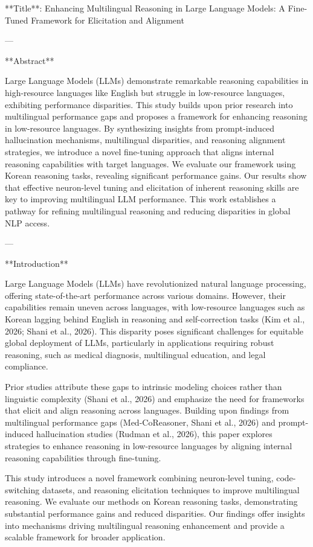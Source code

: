 **Title**: Enhancing Multilingual Reasoning in Large Language Models: A Fine-Tuned Framework for Elicitation and Alignment  

---

**Abstract**

Large Language Models (LLMs) demonstrate remarkable reasoning capabilities in high-resource languages like English but struggle in low-resource languages, exhibiting performance disparities. This study builds upon prior research into multilingual performance gaps and proposes a framework for enhancing reasoning in low-resource languages. By synthesizing insights from prompt-induced hallucination mechanisms, multilingual disparities, and reasoning alignment strategies, we introduce a novel fine-tuning approach that aligns internal reasoning capabilities with target languages. We evaluate our framework using Korean reasoning tasks, revealing significant performance gains. Our results show that effective neuron-level tuning and elicitation of inherent reasoning skills are key to improving multilingual LLM performance. This work establishes a pathway for refining multilingual reasoning and reducing disparities in global NLP access.

---

**Introduction**

Large Language Models (LLMs) have revolutionized natural language processing, offering state-of-the-art performance across various domains. However, their capabilities remain uneven across languages, with low-resource languages such as Korean lagging behind English in reasoning and self-correction tasks (Kim et al., 2026; Shani et al., 2026). This disparity poses significant challenges for equitable global deployment of LLMs, particularly in applications requiring robust reasoning, such as medical diagnosis, multilingual education, and legal compliance.

Prior studies attribute these gaps to intrinsic modeling choices rather than linguistic complexity (Shani et al., 2026) and emphasize the need for frameworks that elicit and align reasoning across languages. Building upon findings from multilingual performance gaps (Med-CoReasoner, Shani et al., 2026) and prompt-induced hallucination studies (Rudman et al., 2026), this paper explores strategies to enhance reasoning in low-resource languages by aligning internal reasoning capabilities through fine-tuning.

This study introduces a novel framework combining neuron-level tuning, code-switching datasets, and reasoning elicitation techniques to improve multilingual reasoning. We evaluate our methods on Korean reasoning tasks, demonstrating substantial performance gains and reduced disparities. Our findings offer insights into mechanisms driving multilingual reasoning enhancement and provide a scalable framework for broader application.

